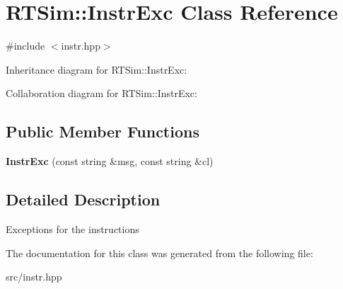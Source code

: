\hypertarget{classRTSim_1_1InstrExc}{}\section{R\+T\+Sim\+:\+:Instr\+Exc Class Reference}
\label{classRTSim_1_1InstrExc}


{\ttfamily \#include $<$instr.\+hpp$>$}



Inheritance diagram for R\+T\+Sim\+:\+:Instr\+Exc\+:


Collaboration diagram for R\+T\+Sim\+:\+:Instr\+Exc\+:
\subsection*{Public Member Functions}
\begin{DoxyCompactItemize}
\item 
{\bfseries Instr\+Exc} (const string \&msg, const string \&cl)\hypertarget{classRTSim_1_1InstrExc_aad31217cfbd4cd61e558379100f15aee}{}\label{classRTSim_1_1InstrExc_aad31217cfbd4cd61e558379100f15aee}

\end{DoxyCompactItemize}


\subsection{Detailed Description}
Exceptions for the instructions 

The documentation for this class was generated from the following file\+:\begin{DoxyCompactItemize}
\item 
src/instr.\+hpp\end{DoxyCompactItemize}
